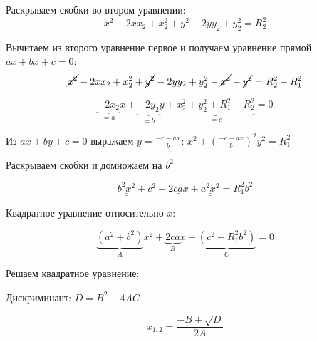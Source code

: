 \documentclass[a4paper,notitlepage,11pt]{article}
\begin{document}

Раскрываем скобки во втором уравнении:
$$x^2 - 2x{x_2} + x_2^2 + y^2 - 2y{y_2} + y_2^2 = {R_2^2}$$

Вычитаем из второго уравнение первое и получаем уравнение прямой $ax + bx + c = 0$:
$$\cancel{x^2} - 2x{x_2} + x_2^2 + \cancel{y^2} - 2y{y_2} + y_2^2 - \cancel{x^2} - \cancel{y^2} = {R_2^2} - {R_1^2}$$

$$\underbrace{-2{x_2}}_{= a}x + \underbrace{- 2{y_2}}_{= b}y + \underbrace{x_2^2 + y_2^2 + {R_1^2} - {R_2^2}}_{= c} = 0$$

Из $ax + by + c = 0$ выражаем $y = \frac{-c-ax}{b}$: 
$x^2 + (\frac{-c-ax}{b})^2 y^2 = R_1^2$

Раскрываем скобки и домножаем на $b^2$

$$\underline{\underline{{b^2}{x^2}}} + c^2 + \underline{2cax} + \underline{\underline{{a^2}{x^2}}} = {R_1^2}{b^2}$$

Квадратное уравнение относительно $x$:

$$\underbrace{(a^2+b^2)}_{A}x^2 + \underbrace{2ca}_{B}x + \underbrace{(c^2 - {R_1^2}{b^2})}_{C} = 0$$

Решаем квадратное уравнение:

Дискриминант: $D = B^2 - 4AC$


$$x_{1,2} = \frac{-B \pm \sqrt{D}}{2A}$$
\end{document}
